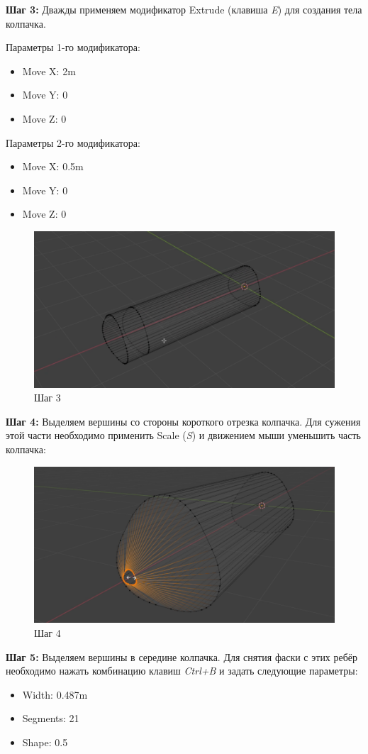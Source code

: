 \documentclass[areasetadvanced]{scrartcl}
\begin{document}
\par \textbf{Шаг 3:} Дважды применяем модификатор Extrude (клавиша \textit{E}) для создания тела колпачка.
\par Параметры 1-го модификатора:
\begin{itemize}
    \item Move X: 2m
    \item Move Y: 0
    \item Move Z: 0
\end{itemize}
\par Параметры 2-го модификатора:
\begin{itemize}
    \item Move X: 0.5m
    \item Move Y: 0
    \item Move Z: 0
\end{itemize}
\begin{figure}[H]
    \label{4} 
    \centering
    \includegraphics[width=0.6\linewidth]{col/3.png}
    \caption{Шаг 3}
\end{figure} 


\par \textbf{Шаг 4:} Выделяем вершины со стороны короткого отрезка колпачка. Для сужения этой части необходимо применить Scale (\textit{S}) и движением мыши уменьшить часть колпачка:

\begin{figure}[H]
    \label{4} 
    \centering
    \includegraphics[width=0.6\linewidth]{col/4.png}
    \caption{Шаг 4}
\end{figure} 


\par \textbf{Шаг 5:} Выделяем вершины в середине колпачка. Для снятия фаски с этих ребёр необходимо нажать комбинацию клавиш \textit{Ctrl+B} и задать следующие параметры:
\begin{itemize}
    \item Width: 0.487m
    \item Segments: 21
    \item Shape: 0.5
\end{itemize}
\end{document}
